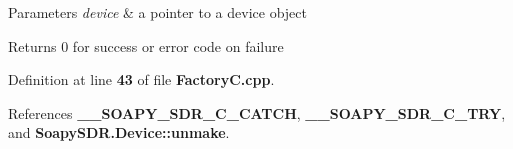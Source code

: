 \begin{DoxyParams}{Parameters}
{\em device} & a pointer to a device object \\
\hline
\end{DoxyParams}
\begin{DoxyReturn}{Returns}
0 for success or error code on failure 
\end{DoxyReturn}


Definition at line {\bf 43} of file {\bf Factory\+C.\+cpp}.



References {\bf \+\_\+\+\_\+\+S\+O\+A\+P\+Y\+\_\+\+S\+D\+R\+\_\+\+C\+\_\+\+C\+A\+T\+CH}, {\bf \+\_\+\+\_\+\+S\+O\+A\+P\+Y\+\_\+\+S\+D\+R\+\_\+\+C\+\_\+\+T\+RY}, and {\bf Soapy\+S\+D\+R.\+Device\+::unmake}.

